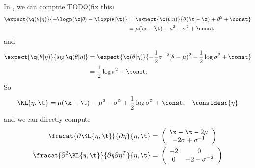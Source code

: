 \begin{ex}
%
In , we can compute
TODO(fix this)
%
\begin{align*}
%
\expect{\q(\theta \vert \eta)}
       {-\logp(\x \vert \theta) - \logp(\theta \vert \t)} ={}&
\expect{\q(\theta \vert \eta)}{\theta(\t - \x) + \theta^2 + \const}
\\={}&
\mu (\x - \t) - \mu^2 - \sigma^2  + \const %
%
\end{align*}
%
and
%
\begin{align*}
%
\expect{\q(\theta \vert \eta)}{\log \q(\theta \vert \eta)} ={}&
\expect{\q(\theta \vert \eta)}
       {-\frac{1}{2} \sigma^{-2} (\theta - \mu)^2 -\frac{1}{2} \log \sigma^2 +
        \const} %
\\={}& \frac{1}{2} \log \sigma^2 + \const. %
%
\end{align*}
%
So
%
\begin{align*}
%
\KL{\eta, \t} ={}&
    \mu (\x - \t) - \mu^2 - \sigma^2 + \frac{1}{2} \log \sigma^2 +
    \const,
    &\constdesc{\eta}
%
\end{align*}
%
and we can directly compute
%
\begin{align*}
%
\fracat{\partial \KL{\eta, \t}}{\partial\eta}{\eta, \t} ={}&
    \left(\begin{array}{c}
    \x - \t - 2\mu\\
    -2\sigma + \sigma^{-1}
    \end{array}\right)\\
\fracat{\partial^2 \KL{\eta, \t}}{\partial\eta \partial \eta^T}{\eta, \t} ={}&
    \left(\begin{array}{cc}
    -2          &           0\\
    0           &           -2 - \sigma^{-2}
    \end{array}\right)\\
%
\end{align*}
%


%
\end{ex}






